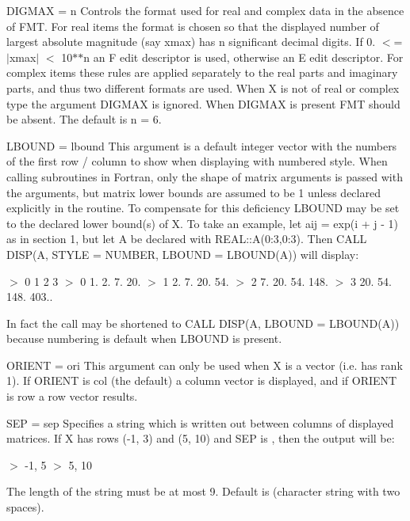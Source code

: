 D\+I\+G\+M\+AX = n Controls the format used for real and complex data in the absence of F\+MT. For real items the format is chosen so that the displayed number of largest absolute magnitude (say xmax) has n significant decimal digits. If 0. $<$= $\vert$xmax$\vert$ $<$ 10$\ast$$\ast$n an F edit descriptor is used, otherwise an E edit descriptor. For complex items these rules are applied separately to the real parts and imaginary parts, and thus two different formats are used. When X is not of real or complex type the argument D\+I\+G\+M\+AX is ignored. When D\+I\+G\+M\+AX is present F\+MT should be absent. The default is n = 6.

L\+B\+O\+U\+ND = lbound This argument is a default integer vector with the numbers of the first row / column to show when displaying with numbered style. When calling subroutines in Fortran, only the shape of matrix arguments is passed with the arguments, but matrix lower bounds are assumed to be 1 unless declared explicitly in the routine. To compensate for this deficiency L\+B\+O\+U\+ND may be set to the declared lower bound(s) of X. To take an example, let aij = exp(i + j -\/ 1) as in section 1, but let A be declared with R\+E\+A\+L\+::\+A(0\+:3,0\+:3). Then C\+A\+LL D\+I\+SP(A, S\+T\+Y\+LE = \textquotesingle{}N\+U\+M\+B\+ER\textquotesingle{}, L\+B\+O\+U\+ND = L\+B\+O\+U\+N\+D(\+A)) will display\+:

$>$ 0 1 2 3 $>$ 0 1. 2. 7. 20. $>$ 1 2. 7. 20. 54. $>$ 2 7. 20. 54. 148. $>$ 3 20. 54. 148. 403..

In fact the call may be shortened to C\+A\+LL D\+I\+SP(A, L\+B\+O\+U\+ND = L\+B\+O\+U\+N\+D(\+A)) because numbering is default when L\+B\+O\+U\+ND is present.

O\+R\+I\+E\+NT = ori This argument can only be used when X is a vector (i.\+e. has rank 1). If O\+R\+I\+E\+NT is \textquotesingle{}col\textquotesingle{} (the default) a column vector is displayed, and if O\+R\+I\+E\+NT is \textquotesingle{}row\textquotesingle{} a row vector results.

S\+EP = sep Specifies a string which is written out between columns of displayed matrices. If X has rows (-\/1, 3) and (5, 10) and S\+EP is \textquotesingle{}, \textquotesingle{} then the output will be\+:

$>$ -\/1, 5 $>$ 5, 10

The length of the string must be at most 9. Default is \textquotesingle{} \textquotesingle{} (character string with two spaces).

